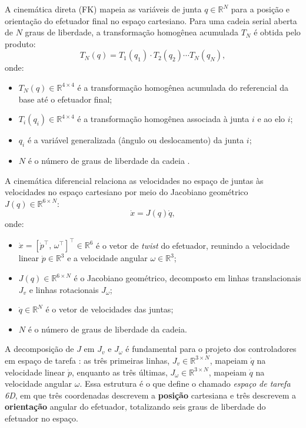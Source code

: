 A cinemática direta (FK) mapeia as variáveis de junta $q \in \mathbb{R}^N$ para a posição e orientação do efetuador final no espaço cartesiano. Para uma cadeia serial aberta de $N$ graus de liberdade, a transformação homogênea acumulada $T_N$ é obtida pelo produto:
\begin{equation}
    T_N(q) = T_1(q_1) \cdot T_2(q_2) \cdots T_N(q_N),
\end{equation}
onde:
\begin{itemize}
    \item $T_N(q) \in \mathbb{R}^{4\times 4}$ é a transformação homogênea acumulada do referencial da base até o efetuador final;
    \item $T_i(q_i) \in \mathbb{R}^{4\times 4}$ é a transformação homogênea associada à junta $i$ e ao elo $i$;
    \item $q_i$ é a variável generalizada (ângulo ou deslocamento) da junta $i$;
    \item $N$ é o número de graus de liberdade da cadeia \cite{spong2020robot}.
\end{itemize}

A cinemática diferencial relaciona as velocidades no espaço de juntas às velocidades no espaço cartesiano por meio do Jacobiano geométrico $J(q) \in \mathbb{R}^{6 \times N}$:
\begin{equation}
    \dot{x} = J(q)\dot{q},
    \label{eq:jacobian}
\end{equation}
onde:
\begin{itemize}
    \item $\dot{x} = [\dot{p}^\top,\, \omega^\top]^\top \in \mathbb{R}^{6}$ é o vetor de \textit{twist} do efetuador, reunindo a velocidade linear $\dot{p} \in \mathbb{R}^{3}$ e a velocidade angular $\omega \in \mathbb{R}^{3}$;
    \item $J(q) \in \mathbb{R}^{6\times N}$ é o Jacobiano geométrico, decomposto em linhas translacionais $J_v$ e linhas rotacionais $J_\omega$;
    \item $\dot{q} \in \mathbb{R}^{N}$ é o vetor de velocidades das juntas;
    \item $N$ é o número de graus de liberdade da cadeia.
\end{itemize}
A decomposição de $J$ em $J_v$ e $J_\omega$ é fundamental para o projeto dos controladores em espaço de tarefa \cite{siciliano2009robotics}: as três primeiras linhas, $J_v \in \mathbb{R}^{3 \times N}$, mapeiam $\dot{q}$ na velocidade linear $\dot{p}$, enquanto as três últimas, $J_\omega \in \mathbb{R}^{3 \times N}$, mapeiam $\dot{q}$ na velocidade angular $\omega$. Essa estrutura é o que define o chamado \emph{espaço de tarefa 6D}, em que três coordenadas descrevem a \textbf{posição} cartesiana e três descrevem a \textbf{orientação} angular do efetuador, totalizando seis graus de liberdade do efetuador no espaço.

